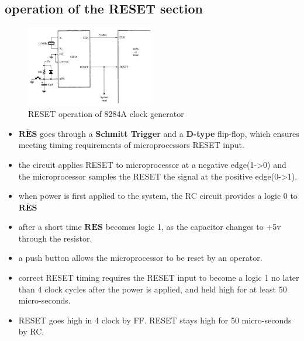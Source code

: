 \documentclass[12pt]{article}
\begin{document}
\subsection{operation of the RESET section}
\begin{figure}[H]
	\centering
	\captionsetup{justification=centering}
	\includegraphics[width = 0.5\textwidth]{image/reset_8284A.png}
	\caption{
		RESET operation of 8284A clock generator
	}
	
\end{figure}
\begin{itemize}
	\item $\overline{\textbf{RES}}$ goes through a \textbf{Schmitt Trigger} and a \textbf{D-type} flip-flop, which ensures meeting timing requirements of microprocessors RESET input.
	
	\item the circuit applies RESET to microprocessor at a negative edge(1->0) and the microprocessor samples the RESET the signal at the positive edge(0->1).
	
	\item when power is first applied to the system, the RC circuit provides a logic 0 to $\overline{\textbf{RES}}$
	
	\item after a short time $\overline{\textbf{RES}}$ becomes logic 1, as the capacitor changes to +5v through the resistor.
	
	\item a push button allows the microprocessor to be reset by an operator.
	
	\item correct RESET timing requires the RESET input to become a logic 1 no later than 4 clock cycles after the power is applied, and held high for at least 50 micro-seconds.
	
	\item RESET goes high in 4 clock by FF. RESET stays high for 50 micro-seconds by RC.
	
\end{itemize}
\end{document}
